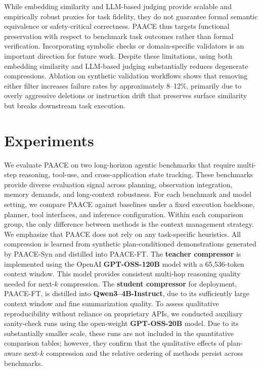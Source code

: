 \documentclass{article}
\theoremstyle{plain}
\theoremstyle{definition}
\theoremstyle{remark}
\begin{document}
While embedding similarity and LLM-based judging provide scalable and empirically robust
proxies for task fidelity, they do not guarantee formal semantic equivalence or safety-critical
correctness. PAACE thus targets functional preservation with respect to benchmark task
outcomes rather than formal verification. Incorporating symbolic checks or domain-specific
validators is an important direction for future work. Despite these limitations, using both embedding similarity and LLM-based judging substantially
reduces degenerate compressions. Ablation on synthetic validation workflows shows that removing
either filter increases failure rates by approximately 8--12\%, primarily due to overly
aggressive deletions or instruction drift that preserves surface similarity but breaks
downstream task execution.

\section{Experiments}
\label{sec:experiments}

We evaluate PAACE on two long-horizon agentic benchmarks that require multi-step reasoning, tool-use, and cross-application state tracking. These benchmarks provide diverse evaluation signal across planning, observation integration, memory demands, and long-context robustness. For each benchmark and model setting, we compare PAACE against baselines under a fixed execution backbone, planner, tool interfaces, and inference configuration. Within each comparison group, the only difference between methods is the context management strategy. We emphasize that PAACE does not rely on any task-specific heuristics.  All compression is learned from synthetic plan-conditioned demonstrations generated by PAACE-Syn and distilled into PAACE-FT. The \textbf{teacher compressor} is implemented using the OpenAI \textbf{GPT-OSS-120B} model with a 65{,}536-token context window. This model provides consistent multi-hop reasoning quality needed for next-$k$ compression. The \textbf{student compressor} for deployment, PAACE-FT, is distilled into \textbf{Qwen3--4B-Instruct}, due to its sufficiently large context window and fine summarization quality. 
To assess qualitative reproducibility without reliance on proprietary APIs,
we conducted auxiliary sanity-check runs using the open-weight
\textbf{GPT-OSS-20B} model.
Due to its substantially smaller scale, these runs are not included in the
quantitative comparison tables; however, they confirm that the qualitative
effects of plan-aware next-$k$ compression and the relative ordering of
methods persist across benchmarks.
\end{document}
